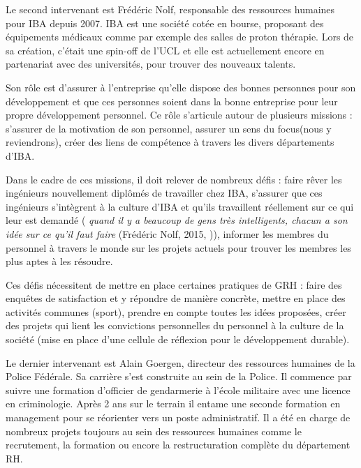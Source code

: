 Le second intervenant est Frédéric Nolf, responsable des ressources humaines pour IBA depuis 2007. IBA est une société cotée en bourse, proposant des équipements médicaux comme par exemple des salles de proton thérapie. Lors de sa création, c'était une spin-off de l'UCL et elle est actuellement encore en partenariat avec des universités, pour trouver des nouveaux talents. \newline

Son rôle est d'assurer à l'entreprise qu'elle dispose des bonnes personnes pour son développement et que ces personnes soient dans la bonne entreprise pour leur propre développement personnel. Ce rôle s'articule autour de plusieurs missions : s'assurer de la motivation de son personnel, assurer un \og{} sens du focus\fg{}(nous y reviendrons), créer des liens de compétence à travers les divers départements d'IBA. \newline

Dans le cadre de ces missions, il doit relever de nombreux défis : faire rêver les ingénieurs nouvellement diplômés de travailler chez IBA, s'assurer que ces ingénieurs s'intègrent à la culture d'IBA et qu'ils travaillent réellement sur ce qui leur est demandé (\textit{\og{} quand il y a beaucoup de gens très intelligents, chacun a son idée sur ce qu'il faut faire \fg{}} (Frédéric Nolf, 2015, \cite{tableronde})), informer les membres du personnel à travers le monde sur les projets actuels pour trouver les membres les plus aptes à les résoudre. \newline

Ces défis nécessitent de mettre en place certaines pratiques de GRH : faire des enquêtes de satisfaction et y répondre de manière concrète, mettre en place des activités communes (sport), prendre en compte toutes les idées proposées, créer des projets qui lient les convictions personnelles du personnel à la culture de la société (mise en place d'une cellule de réflexion pour le développement durable). \newline

Le dernier intervenant est Alain Goergen, directeur des ressources humaines de la Police Fédérale. Sa carrière s'est construite au sein de la Police. Il commence par suivre une formation d'officier de gendarmerie à l'école militaire avec une licence en criminologie. Après 2 ans sur le terrain il entame une seconde formation en management pour se réorienter vers un poste administratif. Il a été en charge de nombreux projets toujours au sein des ressources humaines comme le recrutement, la formation ou encore la restructuration complète du département RH.\newline

